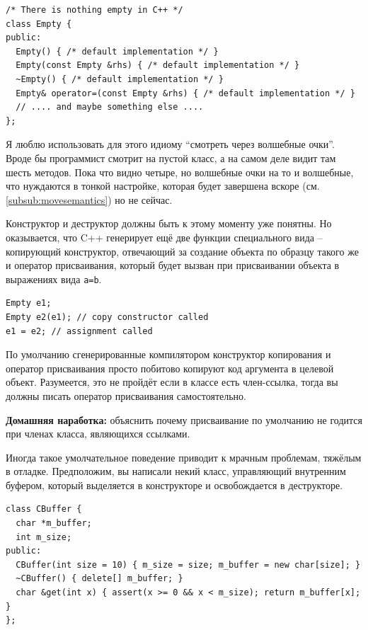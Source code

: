 \documentclass[a4paper,12pt,oneside]{book}
\begin{document}
\begin{lstlisting}
/* There is nothing empty in C++ */
class Empty {
public:
  Empty() { /* default implementation */ }
  Empty(const Empty &rhs) { /* default implementation */ }
  ~Empty() { /* default implementation */ }
  Empty& operator=(const Empty &rhs) { /* default implementation */ }
  // .... and maybe something else ....
};
\end{lstlisting}

Я люблю использовать для этого идиому ``смотреть через волшебные очки''. Вроде бы программист смотрит на пустой класс, а на самом деле видит там шесть методов. Пока что видно четыре, но волшебные очки на то и волшебные, что нуждаются в тонкой настройке, которая будет завершена вскоре (см. \ref{subsub:movesemantics}) но не сейчас.

Конструктор и деструктор должны быть к этому моменту уже понятны. Но оказывается, что C++ генерирует ещё две функции специального вида – копирующий конструктор, отвечающий за создание объекта по образцу такого же и оператор присваивания, который будет вызван при присваивании объекта в выражениях вида \lstinline!a=b!.

\begin{lstlisting}
Empty e1;
Empty e2(e1); // copy constructor called
e1 = e2; // assignment called 
\end{lstlisting}

По умолчанию сгенерированные компилятором конструктор копирования и оператор присваивания просто побитово копируют код аргумента в целевой объект. Разумеется, это не пройдёт если в классе есть член-ссылка, тогда вы должны писать оператор присваивания самостоятельно.

\textbf{Домашняя наработка:} объяснить почему присваивание по умолчанию не годится при членах класса, являющихся ссылками.

Иногда такое умолчательное поведение приводит к мрачным проблемам, тяжёлым в отладке. Предположим, вы написали некий класс, управляющий внутренним буфером, который выделяется в конструкторе и освобождается в деструкторе.

\begin{lstlisting}
class CBuffer {
  char *m_buffer;
  int m_size;
public:
  CBuffer(int size = 10) { m_size = size; m_buffer = new char[size]; }
  ~CBuffer() { delete[] m_buffer; }
  char &get(int x) { assert(x >= 0 && x < m_size); return m_buffer[x]; } 
};
\end{lstlisting}
\end{document}
